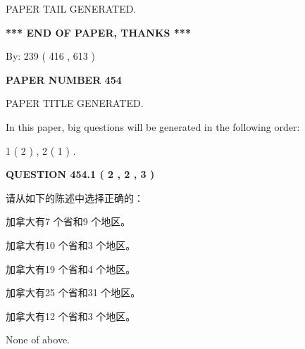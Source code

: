 \documentclass{ctexart}
\begin{document}
\vspace{2.0in} PAPER TAIL GENERATED.
   
   
   
   
\vspace{1.0in} 
{\textbf{\large{ *** END OF PAPER, THANKS *** }}} 
   
   
\hspace{1.0in} By: 
 239 ( 416 ,  613 )
   
   
   
   
\newpage 
\setcounter{page}{ 
   454001 } 
   
   
   
   
 {\textbf{ \Large{ PAPER NUMBER  454  }}}
   
   
\vspace{0.2in}
   
   
   
   
   
   
   
   
 \vspace{0.2in}
 
 
 
 
   
   
 PAPER TITLE GENERATED.
   
   
   
\vspace{0.2in}
   
In this paper, big questions will be generated in the following order: 
   
   
   1 ( 2 )
 ,
   2 ( 1 )
 .
  
\vspace{0.2in}
  
{\textbf{\Large{QUESTION
454.1 
 ( 2 , 2 , 3 )
}}}
  
  
请从如下的陈述中选择正确的：
 
 
加拿大有7 个省和9 个地区。
 
 
加拿大有10 个省和3 个地区。
 
 
加拿大有19 个省和4 个地区。
 
 
加拿大有25 个省和31 个地区。
 
 
加拿大有12 个省和3 个地区。
 
 
 None of above.
 
 
\noindent{}
 
\end{document}
